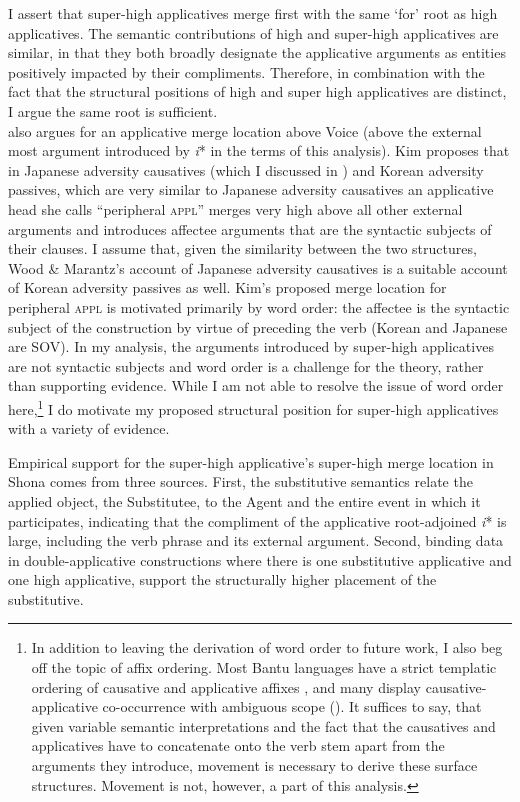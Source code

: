 \documentclass[output=paper,modfonts,nonflat,colorlinks,citecolor=brown]{langsci/langscibook}
\begin{document}
I assert that super-high applicatives merge first with the same ‘for’ root as high applicatives. The semantic contributions of high and super-high applicatives are similar, in that they both broadly designate the applicative arguments as entities positively impacted by their compliments. Therefore, in combination with the fact that the structural positions of high and super high applicatives are distinct, I argue the same root is sufficient.\\

\citet{Kim2011thesis,Kim2012heads} also argues for an applicative merge location above Voice (above the external most argument introduced by \textit{i}* in the terms of this analysis). Kim proposes that in Japanese adversity causatives (which I discussed in ) and Korean adversity passives, which are very similar to Japanese adversity causatives an applicative head she calls “peripheral \textsc{appl}” merges very high above all other external arguments and introduces affectee arguments that are the syntactic subjects of their clauses. I assume that, given the similarity between the two structures, Wood \& Marantz’s account of Japanese adversity causatives is a suitable account of Korean adversity passives as well. Kim’s proposed merge location for peripheral \textsc{appl} is motivated primarily by word order: the affectee is the syntactic subject of the construction by virtue of preceding the verb (Korean and Japanese are SOV). In my analysis, the arguments introduced by super-high applicatives are not syntactic subjects and word order is a challenge for the theory, rather than supporting evidence. While I am not able to resolve the issue of word order here,\footnote{In addition to leaving the derivation of word order to future work, I also beg off the topic of affix ordering. Most Bantu languages have a strict templatic ordering of causative and applicative affixes \citep{Good2005}, and many display causative-applicative co-occurrence with ambiguous scope (\citealt{Baker1985,Hyman2002}). It suffices to say, that given variable semantic interpretations and the fact that the causatives and applicatives have to concatenate onto the verb stem apart from the arguments they introduce, movement is necessary to derive these surface structures. Movement is not, however, a part of this analysis.}  I do motivate my proposed structural position for super-high applicatives with a variety of evidence. 



Empirical support for the super-high applicative’s super-high merge location in Shona comes from three sources. First, the substitutive semantics relate the applied object, the Substitutee, to the Agent and the entire event in which it participates, indicating that the compliment of the applicative root-adjoined \textit{i}* is large, including the verb phrase and its external argument.  Second, binding data in double-applicative constructions where there is one substitutive applicative and one high applicative, support the structurally higher placement of the substitutive. 
\end{document}
